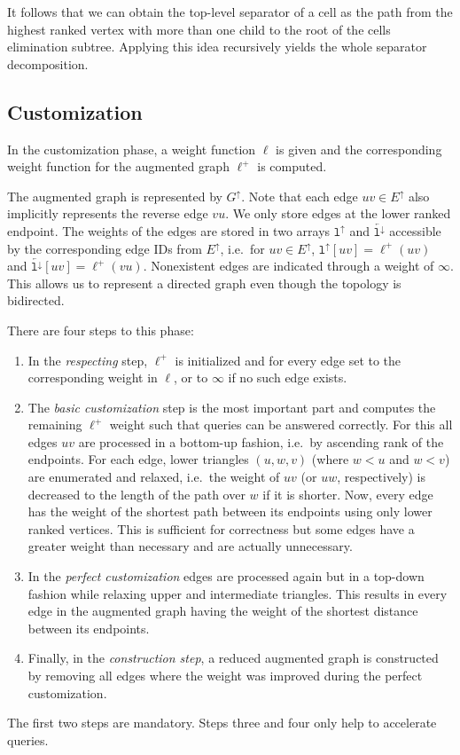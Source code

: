 \documentclass[a4paper, english, cleveref]{lipics-v2021}
\newcommand*{\gchu}{G^{\uparrow}}
\newcommand*{\echu}{E^{\uparrow}}
\newcommand*{\lchu}{\mathtt{l}^{\uparrow}}
\newcommand*{\rlchd}{\overleftarrow{\mathtt{l}^{\downarrow}}}
\begin{document}
It follows that we can obtain the top-level separator of a cell as the path from the highest ranked vertex with more than one child to the root of the cells elimination subtree.
Applying this idea recursively yields the whole separator decomposition.


\subsection{Customization}


In the customization phase, a weight function $\ell$ is given and the corresponding weight function for the augmented graph $\ell^+$ is computed.

The augmented graph is represented by $\gchu$.
Note that each edge $uv \in \echu$ also implicitly represents the reverse edge $vu$.
We only store edges at the lower ranked endpoint.
The weights of the edges are stored in two arrays $\lchu$ and $\rlchd$ accessible by the corresponding edge IDs from $\echu$, i.e.\ for $uv \in \echu$, $\lchu[uv] = \ell^+(uv)$ and $\rlchd[uv] = \ell^+(vu)$.
Nonexistent edges are indicated through a weight of $\infty$.
This allows us to represent a directed graph even though the topology is bidirected.

There are four steps to this phase:
\begin{enumerate}
  \item In the \emph{respecting} step, $\ell^+$ is initialized and for every edge set to the corresponding weight in $\ell$, or to $\infty$ if no such edge exists.
  \item The \emph{basic customization} step is the most important part and computes the remaining $\ell^+$ weight such that queries can be answered correctly.
        For this all edges $uv$ are processed in a bottom-up fashion, i.e.\ by ascending rank of the endpoints.
        For each edge, lower triangles $(u,w,v)$ (where $w < u$ and $w < v$) are enumerated and relaxed, i.e.\ the weight of $uv$ (or $uw$, respectively) is decreased to the length of the path over $w$ if it is shorter.
        Now, every edge has the weight of the shortest path between its endpoints using only lower ranked vertices.
        This is sufficient for correctness but some edges have a greater weight than necessary and are actually unnecessary.
  \item In the \emph{perfect customization} edges are processed again but in a top-down fashion while relaxing upper and intermediate triangles.
        This results in every edge in the augmented graph having the weight of the shortest distance between its endpoints.
  \item Finally, in the \emph{construction step}, a reduced augmented graph is constructed by removing all edges where the weight was improved during the perfect customization.

\end{enumerate}
The first two steps are mandatory.
Steps three and four only help to accelerate queries.
\end{document}
